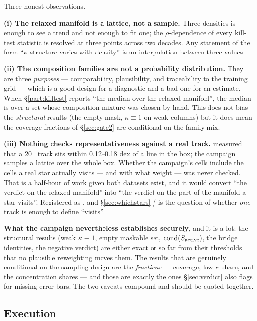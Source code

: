 Three honest observations.

\textbf{(i) The relaxed manifold is a lattice, not a sample.} Three densities
is enough to see a trend and not enough to fit one; the $\rho$-dependence of
every kill-test statistic is resolved at three points across two decades. Any
statement of the form ``$\kappa$ structure varies with density'' is an
interpolation between three values.

\textbf{(ii) The composition families are not a probability distribution.}
They are three \emph{purposes} --- comparability, plausibility, and
traceability to the training grid --- which is a good design for a diagnostic
and a bad one for an estimate. When \S\ref{part:killtest} reports ``the median
over the relaxed manifold'', the median is over a set whose composition mixture
was chosen by hand. This does not bias the \emph{structural} results (the empty
mask, $\kappa \equiv 1$ on weak columns) but it does mean the coverage
fractions of \S\ref{sec:gate2} are conditional on the family mix.

\textbf{(iii) Nothing checks representativeness against a real track.}
 measured that a 20~\Msun{} track sits within 0.12--0.18
dex of a line in the box; the campaign samples a lattice over the whole box.
Whether the campaign's cells include the cells a real star actually visits ---
and with what weight --- was never checked. That is a half-hour of work given
both datasets exist, and it would convert ``the verdict on the relaxed
manifold'' into ``the verdict on the part of the manifold a star visits''.
Registered as , and \S\ref{sec:whichstars} /  is the
question of whether \emph{one} track is enough to define ``visits''.

\textbf{What the campaign nevertheless establishes securely}, and it is a lot:
the structural results (weak $\kappa \equiv 1$, empty maskable set,
$\operatorname{cond}(S_{\mathrm{active}})$, the bridge identities, the \rQSE{} negative verdict) are either
exact or so far from their thresholds that no plausible reweighting moves them.
The results that are genuinely conditional on the sampling design are the
\emph{fractions} --- coverage, low-$\kappa$ share, and the concentration shares
--- and those are exactly the ones \S\ref{sec:verdict} also flags for missing
error bars. The two caveats compound and should be quoted together.

\subsection{Execution}
\label{sec:execution}

